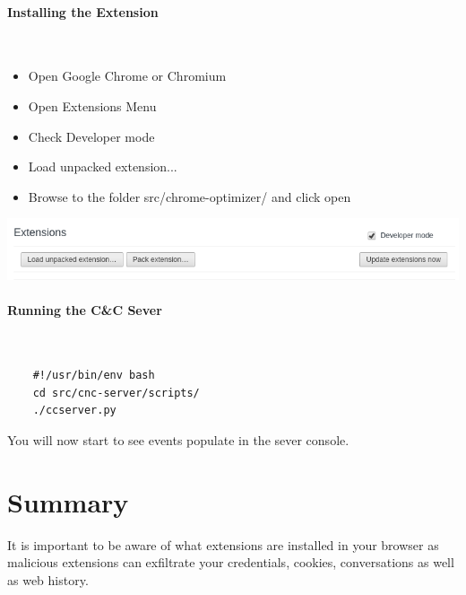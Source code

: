 \documentclass{article}
\newcommand\tab[1][0.5cm]{\hspace*{#1}}
\begin{document}
\paragraph{Installing the Extension}\mbox{}\\
\begin{itemize}
\item Open Google Chrome or Chromium
\item Open Extensions Menu
\item Check Developer mode
\item Load unpacked extension...
\item Browse to the folder src/chrome-optimizer/ and click open
\end{itemize}
\begin{center}
  \includegraphics[scale=0.5]{install_extension}
\end{center}
\paragraph{Running the C\&C Sever}\mbox{}\\
\begin{tcolorbox}[title=run-cnc-server.sh]
  \begin{verbatim}
    #!/usr/bin/env bash
    cd src/cnc-server/scripts/
    ./ccserver.py
  \end{verbatim}
\end{tcolorbox}
\tab You will now start to see events populate in the sever console.

\section{Summary}
\tab It is important to be aware of what extensions are installed in your browser as malicious extensions can exfiltrate your credentials, cookies, conversations as well as web history.
\end{document}
